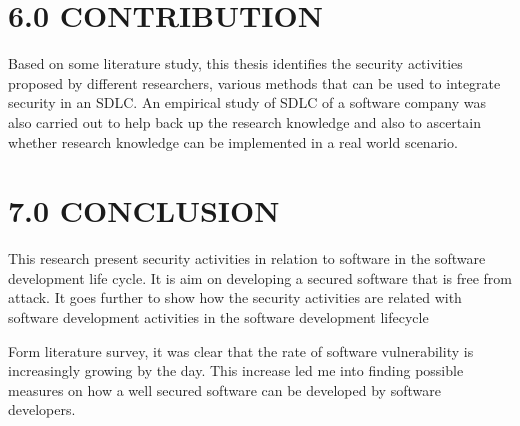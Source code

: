 \documentclass[12pt]{extreport}
\begin{document}
\section*{6.0	CONTRIBUTION}
Based on some literature study, this thesis identifies the security activities proposed by different researchers, various methods that can be used to integrate security in an SDLC. An empirical study of SDLC of a software company was also carried out to help back up the research knowledge and also to ascertain whether research knowledge can be implemented in a real world scenario.

\section*{7.0	CONCLUSION}
This research present security activities in relation to software in the software development life cycle. It is aim on developing a secured software that is free from attack. It goes further to show how the security activities are related with software development activities in the software development lifecycle

Form literature survey, it was clear that the rate of software vulnerability is increasingly growing by the day. This increase led me into finding possible measures on how a well secured software can be developed by software developers.
\end{document}
